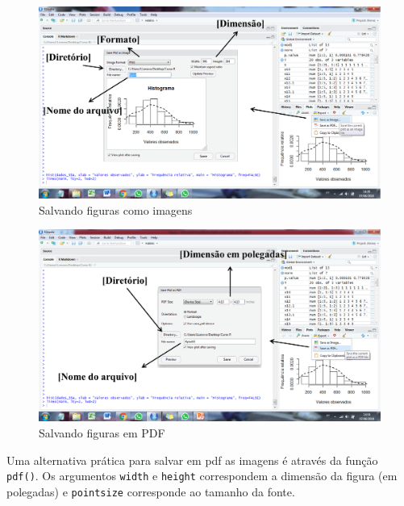 \documentclass[
]{book}
\begin{document}
\begin{figure}
\centering
\includegraphics{figures/Figura.png}
\caption{Salvando figuras como imagens}
\end{figure}

\begin{figure}
\centering
\includegraphics{figures/Figura2.png}
\caption{Salvando figuras em PDF}
\end{figure}

Uma alternativa prática para salvar em pdf as imagens é através da função \texttt{pdf()}. Os argumentos \texttt{width} e \texttt{height} correspondem a dimensão da figura (em polegadas) e \texttt{pointsize} corresponde ao tamanho da fonte. 
\end{document}
